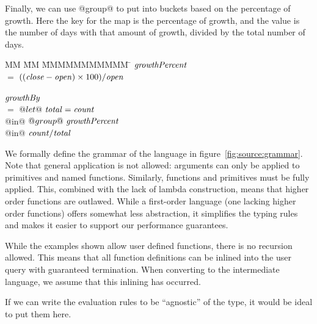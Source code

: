 Finally, we can use @group@ to put into buckets based on the percentage of growth.
Here the key for the map is the percentage of growth, and the value is the number of days with that amount of growth, divided by the total number of days.
\begin{tabbing}
MM \= MM \= MMMMMMMMMMM \= \kill
$\mathit{growthPercent}$                                        \\
 \> $=$  \> $((\mathit{close}-\mathit{open}) \times 100 ) / \mathit{open}$  \\
                                                            \\
$\mathit{growthBy}$                                             \\
 \> $=$  \> $@let@~\mathit{total} = \mathit{count}$                 \\
 \> @in@ \> $@group@~\mathit{growthPercent}$                    \\
 \> @in@ \> $\mathit{count} / \mathit{total}$                    \\
\end{tabbing}



We formally define the grammar of the language in figure~\ref{fig:source:grammar}.
Note that general application is not allowed: arguments can only be applied to primitives and named functions.
Similarly, functions and primitives must be fully applied.
This, combined with the lack of lambda construction, means that higher order functions are outlawed.
While a first-order language (one lacking higher order functions) offers somewhat less abstraction, it simplifies the typing rules and makes it easier to support our performance guarantees.

While the examples shown allow user defined functions, there is no recursion allowed.
This means that all function definitions can be inlined into the user query with guaranteed termination.
When converting to the intermediate language, we assume that this inlining has occurred.

If we can write the evaluation rules to be ``agnostic'' of the type, it would be ideal to put them here.




